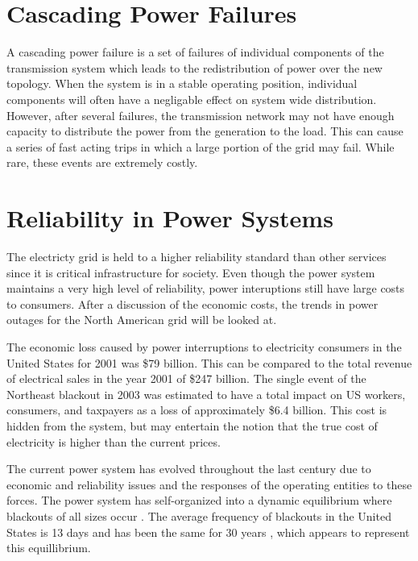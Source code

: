 \documentclass[class=report]{standalone}
\begin{document}
\section{Cascading Power Failures}

A cascading power failure is a set of failures of individual components of the transmission system which leads to the redistribution of power over the new topology.
 When the system is in a stable operating position, individual components will often have a negligable effect on system wide distribution.  However, after several failures, the transmission network may not have enough capacity to distribute the power from the generation to the load.  This can cause a series of fast acting trips in which a large portion of the grid may fail.  While rare, these events are extremely costly.

 

\section{Reliability in Power Systems}
The electricty grid is held to a higher reliability standard than other services since it is critical infrastructure for society.  Even though the power system maintains a very high level of reliability, power interuptions still have large costs to consumers.  After a discussion of the economic costs, the trends in power outages for the North American grid will be looked at.

The economic loss caused by power interruptions to electricity consumers in the United States for 2001 was \$79 billion.\cite{lacommare_2006}  This can be compared to the total revenue of electrical sales in the year 2001 of \$247 billion.  The single event of the Northeast blackout in 2003 was estimated to have a total impact on US workers, consumers, and taxpayers as a loss of approximately \$6.4 billion.\cite{anderson_2003}  This cost is hidden from the system, but may entertain the notion that the true cost of electricity is higher than the current prices.  

The current power system has evolved throughout the last century due to economic and reliability issues and the responses of the operating entities to these forces.  The power system has self-organized into a dynamic equilibrium where blackouts of all sizes occur \cite{dobson_2001}.  The average frequency of blackouts in the United States is 13 days and has been the same for 30 years \cite{carreras_2004}, which appears to represent this equillibrium.  
	
\end{document}
